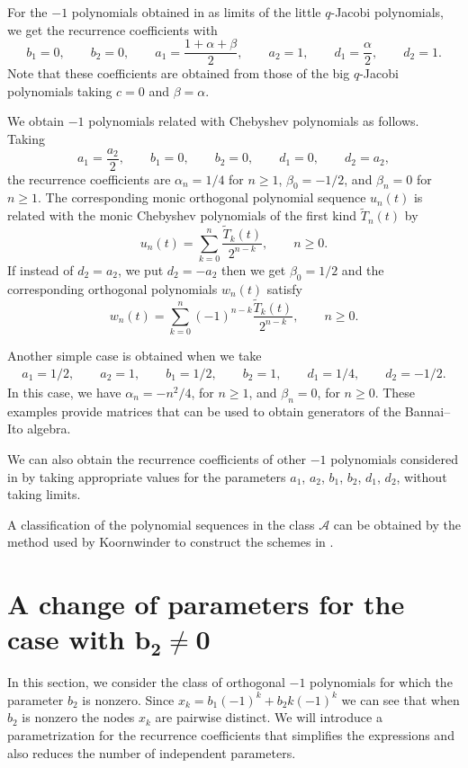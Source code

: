 \documentclass[pdftex]{sigma}
\def\cA{\mathcal A}
\numberwithin{equation}{section}
\begin{document}
For the $-1$ polynomials obtained in \cite{VZ1} as limits of the little $q$-Jacobi polynomials, we get the recurrence coefficients with
\[
b_1=0,\qquad b_2=0,\qquad a_1=\dfrac{1+\alpha + \beta}{2},\qquad a_2=1,\qquad d_1=\dfrac{\alpha}{2},\qquad d_2=1.
\]
Note that these coefficients are obtained from those of the big $q$-Jacobi polynomials taking $c=0$ and $\beta=\alpha$.


We obtain $-1$ polynomials related with Chebyshev polynomials as follows. Taking
\[
a_1=\dfrac{a_2}{2},\qquad b_1=0,\qquad b_2=0,\qquad d_1=0, \qquad d_2=a_2,
\]
the recurrence coefficients are $\alpha_n=1/4$ for $n\ge 1$, $\beta_0=-1/2$, and $\beta_n=0$ for $n\ge 1$. The corresponding monic orthogonal polynomial sequence $u_n(t)$ is related with the monic Chebyshev polynomials of the first kind $\tilde T_n(t)$ by
\[
u_n(t)= \sum_{k=0}^n \dfrac{\tilde T_k(t)}{2^{n-k}}, \qquad n \ge 0.
\]
If instead of $d_2= a_2$, we put $d_2=- a_2$ then we get $\beta_0=1/2$ and the corresponding orthogonal polynomials $w_n(t)$ satisfy
\[
w_n(t)=\sum_{k=0}^n (-1)^{n-k} \dfrac{\tilde T_k(t)}{2^{n-k}}, \qquad n \ge 0.
\]

Another simple case is obtained when we take
\begin{gather*}
 a_1=1/2,\qquad a_2=1,\qquad b_1=1/2,\qquad b_2=1,\qquad d_1=1/4,\qquad d_2=-1/2.
 \end{gather*}
In this case, we have $\alpha_n=-n^2/4$, for $ n\ge 1$, and $\beta_n=0$, for $n\ge 0$. These examples provide matrices that can be used to obtain generators of the Bannai--Ito algebra.

We can also obtain the recurrence coefficients of other $-1$ polynomials considered in \cite{PellVZ} by taking appropriate values for the parameters $a_1$, $a_2$, $b_1$, $b_2$, $d_1$, $d_2$, without taking limits.

A classification of the polynomial sequences in the class $\cA$ can be obtained by the method used by Koornwinder to construct the schemes in \cite{KAsk, K2,K3}.

\section[A change of parameters for the case with b\_2 ne 0]{A change of parameters for the case with $\boldsymbol{b_2 \ne 0}$}\label{section4}
In this section, we consider the class of orthogonal $-1$ polynomials for which the parameter $b_2$ is nonzero. Since $x_k=b_1 (-1)^k + b_2 k (-1)^k$ we can see that when $b_2$ is nonzero the nodes $x_k$ are pairwise distinct.
 We will introduce a parametrization for the recurrence coefficients that simplifies the expressions and also reduces the number of independent parameters.
\end{document}
